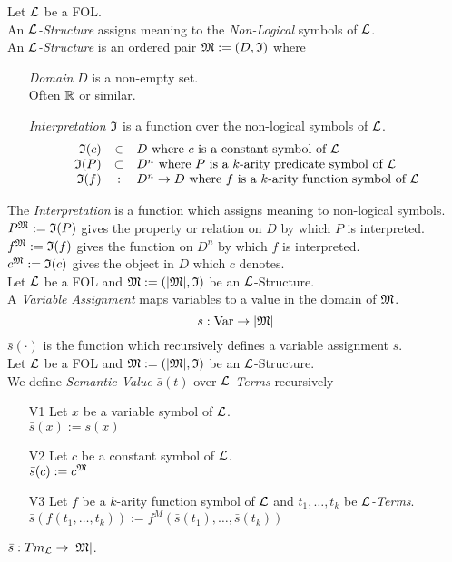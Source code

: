 \documentclass[11pt,a4paper]{article}
\begin{document}
Let $\mathcal{L}$ be a FOL.\\
An \textit{$\mathcal{L}$-Structure} assigns meaning to the \textit{Non-Logical} symbols of $\mathcal{L}$.\\
An \textit{$\mathcal{L}$-Structure} is an ordered pair $\mathfrak{M}:=(D,\mathfrak{I})$ where
\begin{itemize}
	\item[\textit{Domain}] $D$ is a non-empty set.\\
	Often $\mathbb{R}$ or similar.
	\item[\textit{Interpretation}] $\mathfrak{I}$ is a function over the non-logical symbols of $\mathcal{L}$.
	\[\begin{array}{rcl}
	\mathfrak{I}(c)&\in&D\text{ where }c\text{ is a constant symbol of }\mathcal{L}\\
	\mathfrak{I}(P)&\subset&D^n\text{ where }P\text{ is a }k\text{-arity predicate symbol of }\mathcal{L}\\
	\mathfrak{I}(f)&:&D^n\to D\text{ where }f\text{ is a }k\text{-arity function symbol of }\mathcal{L}
	\end{array}\]
\end{itemize}

The \textit{Interpretation} is a function which assigns meaning to non-logical symbols.\\
$P^{\mathfrak{M}}:=\mathfrak{I}(P)$ gives the property or relation on $D$ by which $P$ is interpreted.\\
$f^{\mathfrak{M}}:=\mathfrak{I}(f)$ gives the function on $D^n$ by which $f$ is interpreted.\\
$c^{\mathfrak{M}}:=\mathfrak{I}(c)$ gives the object in $D$ which $c$ denotes.\\

Let $\mathcal{L}$ be a FOL and $\mathfrak{M}:=(|\mathfrak{M}|,\mathfrak{I})$ be an $\mathcal{L}$-Structure.\\
A \textit{Variable Assignment} maps variables to a value in the domain of $\mathfrak{M}$.
$$s:\mathrm{Var}\to|\mathfrak{M}|$$
\nb $\bar{s}(\cdot)$ is the function which recursively defines a variable assignment $s$.\\

Let $\mathcal{L}$ be a FOL and $\mathfrak{M}:=(|\mathfrak{M}|,\mathfrak{I})$ be an $\mathcal{L}$-Structure.\\
We define \textit{Semantic Value} $\bar{s}(t)$ over \textit{$\mathcal{L}$-Terms} recursively
\begin{itemize}
	\item[V1] Let $x$ be a variable symbol of $\mathcal{L}$.\\
	$\bar{s}(x):=s(x)$
	\item[V2] Let $c$ be a constant symbol of $\mathcal{L}$.\\
	$\bar{s}(c):=c^{\mathfrak{M}}$
	\item[V3] Let $f$ be a $k$-arity function symbol of $\mathcal{L}$ and $t_1,\dots,t_k$ be \textit{$\mathcal{L}$-Terms}.\\
	$\bar{s}(f(t_1,\dots,t_k)):=f^M(\bar{s}(t_1),\dots,\bar{s}(t_k))$
\end{itemize}
\nb $\bar{s}:Tm_{\mathcal{L}}\to|\mathfrak{M}|$.\\
\end{document}
